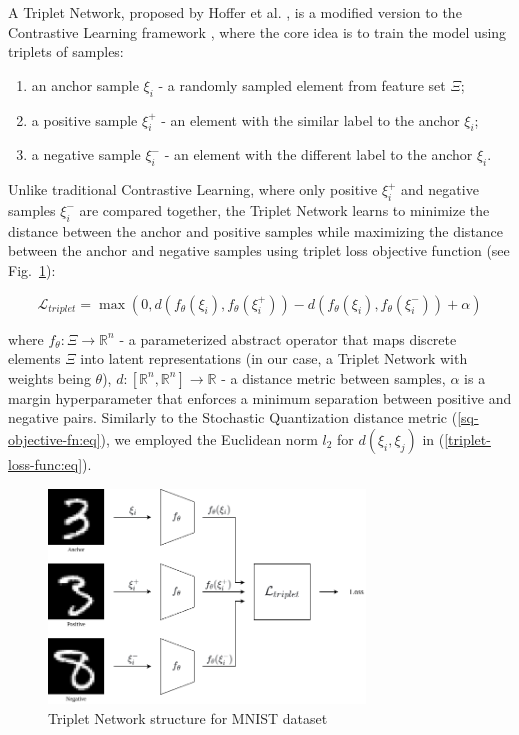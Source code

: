 A Triplet Network, proposed by Hoffer et al. \cite{Hoffer_2015}, is a modified version to the Contrastive Learning framework \cite{Khosla_2020}, where the core idea is to train the model using triplets of samples:

\begin{enumerate}
    \item an anchor sample $ \xi_i $ - a randomly sampled element from feature set $ \Xi $;
    \item a positive sample $ \xi^+_i $ - an element with the similar label to the anchor $ \xi_i $;
    \item a negative sample $ \xi^-_i $ - an element with the different label to the anchor $ \xi_i $.
\end{enumerate}

Unlike traditional Contrastive Learning, where only positive $ \xi^+_i $ and negative samples $ \xi^-_i $ are compared together, the Triplet Network learns to minimize the distance between the anchor and positive samples while maximizing the distance between the anchor and negative samples using triplet loss objective function (see Fig.~\ref{triplet-network:fig}):

\begin{equation}
    \label{triplet-loss-func:eq}
    \mathcal{L}_{triplet} = \max (0, d(f_{\theta}(\xi_i), f_{\theta}(\xi^+_i)) - d(f_{\theta}(\xi_i), f_{\theta}(\xi^-_i)) + \alpha)
\end{equation}

\noindent where $ f_{\theta}: \Xi \to \mathbb{R}^n $ - a parameterized abstract operator that maps discrete elements $ \Xi $ into latent representations (in our case, a Triplet Network with weights being $ \theta $), $d: [\mathbb{R}^n, \mathbb{R}^n] \to \mathbb{R} $ - a distance metric between samples, $\alpha$ is a margin hyperparameter that enforces a minimum separation between positive and negative pairs. Similarly to the Stochastic Quantization distance metric (\ref{sq-objective-fn:eq}), we employed the Euclidean norm $l_2$ for $d(\xi_i, \xi_j)$ in (\ref{triplet-loss-func:eq}).

\begin{figure}
    \centering
    \includegraphics[width=0.75\textwidth]{figures/triplet_loss.png}
    \caption{Triplet Network structure for MNIST dataset \cite{lecun2010mnist}} \label{triplet-network:fig}
\end{figure}

